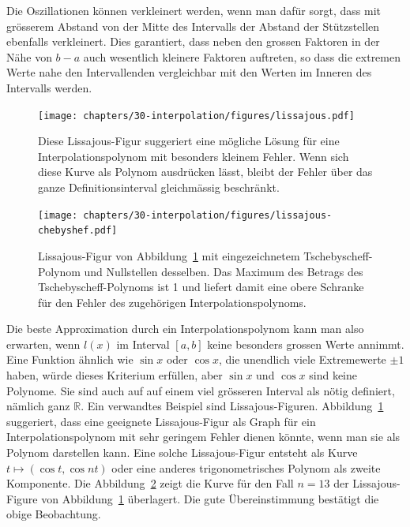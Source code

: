 Die Oszillationen können verkleinert werden, wenn man dafür sorgt, dass
mit grösserem Abstand von der Mitte des Intervalls der Abstand der
Stützstellen ebenfalls verkleinert.
Dies garantiert, dass neben den grossen Faktoren in der Nähe von $b-a$ 
auch wesentlich kleinere Faktoren auftreten, so dass die extremen Werte
nahe den Intervallenden vergleichbar mit den Werten im Inneren des
Intervalls werden.

\begin{figure}
\centering
\texttt{[image: chapters/30-interpolation/figures/lissajous.pdf]}
\caption{Diese Lissajous-Figur suggeriert eine mögliche Lösung für eine 
Interpolationspolynom mit besonders kleinem Fehler.
Wenn sich diese Kurve als Polynom ausdrücken lässt, bleibt der Fehler über
das ganze Definitionsinterval gleichmässig beschränkt.
\label{buch:figure:lissajous}}
\end{figure}

\begin{figure}
\centering
\texttt{[image: chapters/30-interpolation/figures/lissajous-chebyshef.pdf]}
\caption{Lissajous-Figur von Abbildung~\ref{buch:figure:lissajous}
mit eingezeichnetem Tschebyscheff-Polynom und Nullstellen
desselben.
Das Maximum des Betrags des Tschebyscheff-Polynoms ist 1 und liefert 
damit eine obere Schranke für den Fehler des zugehörigen
Interpolationspolynoms.
\label{buch:figure:lissajous-chebyshef}}
\end{figure}

Die beste Approximation durch ein Interpolationspolynom kann man also
erwarten, wenn $l(x)$ im Interval $[a,b]$ keine besonders grossen Werte
annimmt.
Eine Funktion ähnlich wie $\sin x$ oder $\cos x$, die unendlich viele
Extremewerte $\pm 1$ haben, würde dieses Kriterium erfüllen, aber
$\sin x$ und $\cos x$ sind keine Polynome.
Sie sind auch auf auf einem viel grösseren Interval als nötig definiert,
nämlich ganz $\mathbb R$.
Ein verwandtes Beispiel sind Lissajous-Figuren.
Abbildung~\ref{buch:figure:lissajous} suggeriert, dass eine geeignete
Lissajous-Figur als Graph für ein Interpolationspolynom mit sehr
geringem Fehler dienen könnte, wenn man sie als Polynom darstellen kann.
Eine solche Lissajous-Figur entsteht als Kurve
$t\mapsto (\cos t, \cos nt)$ oder eine anderes trigonometrisches
Polynom als zweite Komponente.
Die Abbildung~\ref{buch:figure:lissajous-chebyshef} zeigt die Kurve
für den Fall $n=13$ der Lissajous-Figure von
Abbildung~\ref{buch:figure:lissajous} überlagert.
Die gute Übereinstimmung bestätigt die obige Beobachtung.

